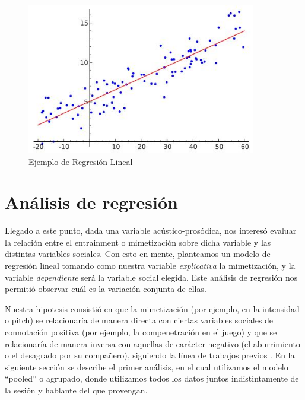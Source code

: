 
\begin{figure}[t!]
\centering
\includegraphics[width=10cm]{images/linear_regression.jpg}
\caption{Ejemplo de Regresión Lineal}
\end{figure}

\section{Análisis de regresión}

Llegado a este punto, dada una variable acústico-prosódica, nos interesó evaluar la relación entre el entrainment o mimetización sobre dicha variable y las distintas variables sociales. Con esto en mente, planteamos un modelo de regresión lineal tomando como nuestra variable \emph{explicativa} la mimetización, y la variable \emph{dependiente} será la variable social elegida. Este análisis de regresión nos permitió observar cuál es la variación conjunta de ellas.

Nuestra hipotesis consistió en que la mimetización (por ejemplo, en la intensidad o pitch) se relacionaría de manera directa con ciertas variables sociales de connotación positiva (por ejemplo, la compenetración en el juego) y que se relacionaría de manera inversa con aquellas de carácter negativo (el aburrimiento o el desagrado por su compañero), siguiendo la línea de trabajos previos \cite{gravano2015backward}. En la siguiente sección se describe el primer análisis, en el cual utilizamos el modelo ``pooled'' o agrupado, donde utilizamos todos los datos juntos indistintamente de la sesión y hablante del que provengan.
